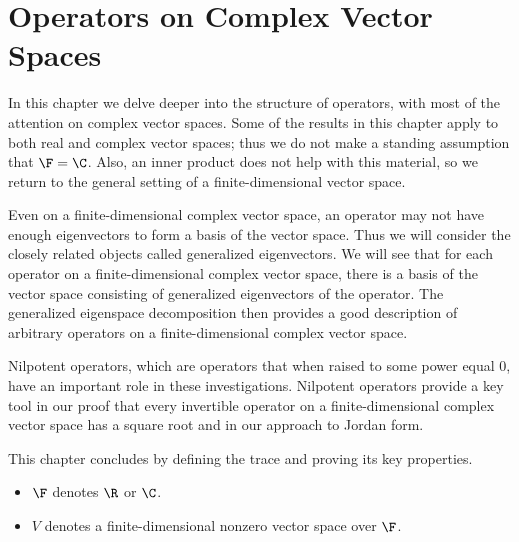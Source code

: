 \chapter{Operators on Complex Vector Spaces}

In this chapter we delve deeper into the structure of operators, with most of
the attention on complex vector spaces. Some of the results in this chapter
apply to both real and complex vector spaces; thus we do not make a standing
assumption that $\F=\C$. Also, an inner product does not help with this
material, so we return to the general setting of a finite-dimensional vector
space.

Even on a finite-dimensional complex vector space, an operator may not have
enough eigenvectors to form a basis of the vector space. Thus we will consider
the closely related objects called generalized eigenvectors. We will see that
for each operator on a finite-dimensional complex vector space, there is a basis
of the vector space consisting of generalized eigenvectors of the operator. The
generalized eigenspace decomposition then provides a good description of
arbitrary operators on a finite-dimensional complex vector space.

Nilpotent operators, which are operators that when raised to some power equal
$0$, have an important role in these investigations. Nilpotent operators provide
a key tool in our proof that every invertible operator on a finite-dimensional
complex vector space has a square root and in our approach to Jordan form.

This chapter concludes by defining the trace and proving its key properties.

\begin{definition*}\leavevmode
\begin{itemize}
\item $\F$ denotes $\R$ or $\C$.
\item $V$ denotes a finite-dimensional nonzero vector space over $\F$.
\end{itemize}
\end{definition*}
